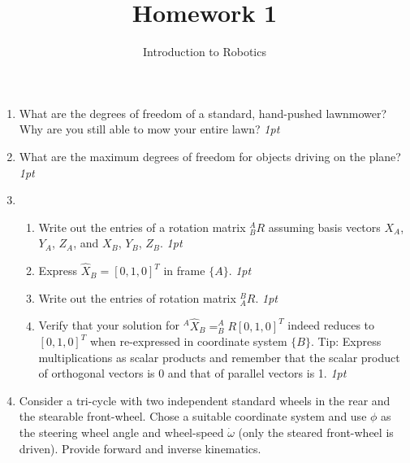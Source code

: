 \documentclass[letter,twoside,11pt]{article}
\begin{document}
\title{Homework 1}
\author{Introduction to Robotics}
\maketitle

\begin{enumerate}
\item What are the degrees of freedom of a standard, hand-pushed lawnmower? Why are you still able to mow your entire lawn? \emph{1pt}
\item What are the maximum degrees of freedom for objects driving on the plane? \emph{1pt}
\item 
\begin{enumerate}
 \item Write out the entries of a rotation matrix $^A_BR$ assuming basis vectors $X_A$, $Y_A$, $Z_A$, and $X_B$, $Y_B$, $Z_B$. \emph{1pt}
 \item Express $\hat{X}_B=[0, 1, 0]^T$ in frame $\{A\}$. \emph{1pt}
 \item Write out the entries of rotation matrix $^B_AR$. \emph{1pt}
 \item Verify that your solution for $^A\hat{X}_B=^A_BR[0, 1, 0]^T$ indeed reduces to $[0, 1, 0]^T$ when re-expressed in coordinate system $\{B\}$.  Tip: Express multiplications as scalar products and remember that the scalar product of orthogonal vectors is 0 and that of parallel vectors is 1. \emph{1pt}
\end{enumerate} 

\item Consider a tri-cycle with two independent standard wheels in the rear and the stearable front-wheel. Chose a suitable coordinate system and use $\phi$ as the steering wheel angle and wheel-speed $\dot{\omega}$ (only the steared front-wheel is driven). Provide forward and inverse kinematics. 

\end{enumerate}




\end{document}

